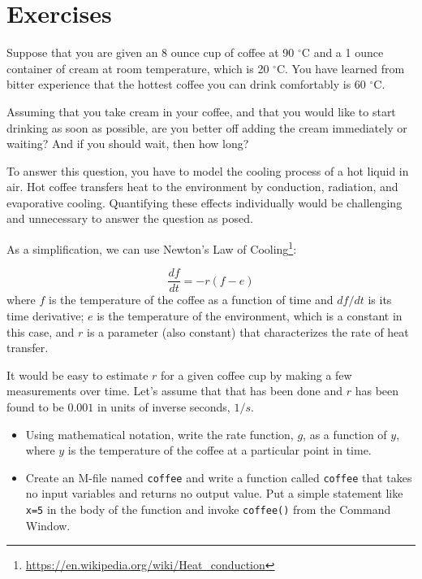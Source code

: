 \documentclass{book}
\begin{document}
\section{Exercises}

\newcommand{\degree}{\ensuremath{^\circ}}

\begin{ex}
Suppose that you are given an 8 ounce cup of coffee at 90 \degree C and
a 1 ounce container of cream at room temperature, which is 20 \degree C.
You have learned from bitter experience that the hottest coffee you
can drink comfortably is 60 \degree C.

Assuming that you take cream in your coffee, and that you would like
to start drinking as soon as possible, are you better off adding
the cream immediately or waiting?  And if you should wait, then how
long?

To answer this question, you have to model the cooling process
of a hot liquid in air.  Hot coffee transfers heat to the environment
by conduction, radiation, and evaporative cooling.  Quantifying these
effects individually would be challenging and unnecessary to answer
the question as posed.

As a simplification, we can use Newton's Law of
Cooling\footnote{\url{https://en.wikipedia.org/wiki/Heat_conduction}}:

\[ \frac{df}{dt} = -r (f - e) \]
%
where $f$ is the temperature of the coffee as a function of time and
$df/dt$ is its time derivative; $e$ is the temperature of the
environment, which is a constant in this case, and $r$ is a parameter
(also constant) that characterizes the rate of heat transfer.

It would be easy to estimate $r$ for a given coffee cup by making
a few measurements over time.  Let's assume that that has been
done and $r$ has been found to be $0.001$ in units of inverse
seconds, $1/s$.

\begin{itemize}

\item Using mathematical notation, write the rate function, $g$,
as a function of $y$, where $y$ is the temperature of the
coffee at a particular point in time.

\item Create an M-file named {\tt coffee} and write a function
called {\tt coffee} that takes no input variables and returns no
output value.  Put a simple statement like {\tt x=5} in the body
of the function and invoke {\tt coffee()} from the Command Window.


\end{itemize}
\end{ex}
\end{document}
